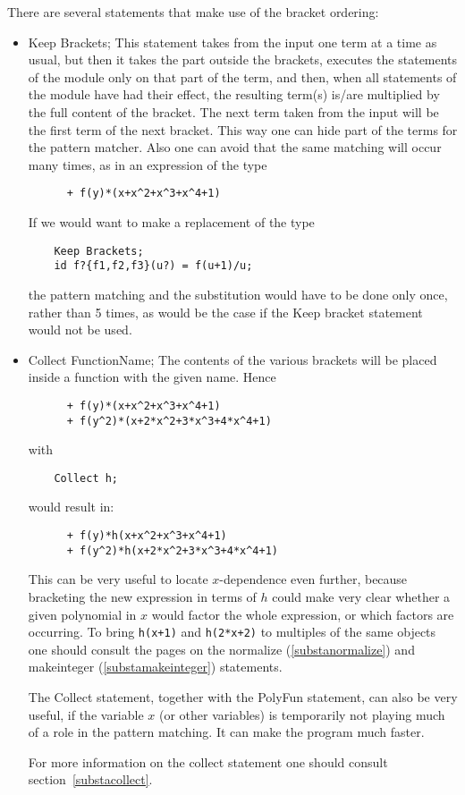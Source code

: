 There are several statements that make use of the bracket ordering:
\begin{itemize}
\item Keep Brackets;
	This statement takes from the input one term at a time as usual, but 
then it takes the part outside the brackets, executes the statements of the 
module only on that part of the term, and then, when all statements of the 
module have had their effect, the resulting term(s) is/are multiplied by 
the full content of the bracket. The next term taken from the input will be 
the first term of the next bracket. This way one can hide part of the terms 
for the pattern matcher. Also one can avoid that the same matching will 
occur many times, as in an expression of the type
\begin{verbatim}
      + f(y)*(x+x^2+x^3+x^4+1)
\end{verbatim}
If we would want to make a replacement of the type
\begin{verbatim}
    Keep Brackets;
    id f?{f1,f2,f3}(u?) = f(u+1)/u;
\end{verbatim}
the pattern matching and the substitution would have to be done only once, 
rather than 5 times, as would be the case if the Keep bracket statement 
would not be used.
\item Collect FunctionName;
	The contents of the various brackets will be placed inside a function 
with the given name. Hence
\begin{verbatim}
      + f(y)*(x+x^2+x^3+x^4+1)
      + f(y^2)*(x+2*x^2+3*x^3+4*x^4+1)
\end{verbatim}
with
\begin{verbatim}
    Collect h;
\end{verbatim}
would result in:
\begin{verbatim}
      + f(y)*h(x+x^2+x^3+x^4+1)
      + f(y^2)*h(x+2*x^2+3*x^3+4*x^4+1)
\end{verbatim}
This can be very useful to locate $x$-dependence even further, because 
bracketing the new expression in terms of $h$ could make very clear 
whether a given polynomial in $x$ would factor the whole expression, or 
which factors are occurring. To bring \verb:h(x+1): and \verb:h(2*x+2): to 
multiples of the same objects one should consult the pages on the 
normalize 
(\ref{substanormalize}) 
and makeinteger (\ref{substamakeinteger}) statements.

The Collect statement, together with the PolyFun statement, 
can also be very useful, if the variable $x$ (or other variables) is 
temporarily not playing much of a role in the pattern matching. It can make 
the program much faster.

For more information on the collect statement one should consult 
section~\ref{substacollect}.
\end{itemize}

